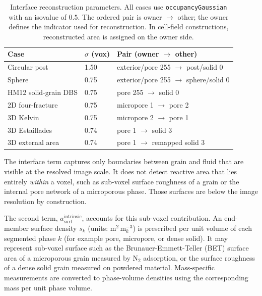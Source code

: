 \begin{table}[htbp]
    \centering
    \caption{Interface reconstruction parameters. All cases use
    \texttt{occupancyGaussian} with an isovalue of $0.5$.
    The ordered pair is owner $\rightarrow$ other; the owner defines the
    indicator used for reconstruction. In cell-field constructions,
    reconstructed area is assigned on the owner side.}
    \label{tab:surfaceConstruction}
    \scriptsize
    \setlength{\tabcolsep}{3pt}
    \begin{tabular}{@{}p{}p{}p{}@{}}
        \toprule
        Case & $\sigma$ (vox) & Pair (owner $\rightarrow$ other) \\
        \midrule
        Circular post & 1.50
            & exterior/pore 255 $\rightarrow$ post/solid 0 \\
        Sphere & 0.75
            & exterior/pore 255 $\rightarrow$ sphere/solid 0 \\
        HM12 solid-grain DBS & 0.75
            & pore 255 $\rightarrow$ solid 0 \\
        2D four-fracture & 0.75
            & micropore 1 $\rightarrow$ pore 2 \\
        3D Kelvin & 0.75
            & micropore 2 $\rightarrow$ pore 1 \\
        3D Estaillades & 0.74
            & pore 1 $\rightarrow$ solid 3 \\
        3D external area & 0.74
            & pore 1 $\rightarrow$ remapped solid 3 \\
        \bottomrule
    \end{tabular}
\end{table}

The interface term captures only boundaries between grain and fluid that are
visible at the resolved image scale. It does not detect
reactive area that lies entirely \emph{within} a voxel, such as sub-voxel
surface roughness of a grain or the internal pore network of a microporous
phase. Those surfaces are below the image resolution by construction.

The second term, $a_{\mathrm{surf}}^{\mathrm{intrinsic}}$, accounts for this
sub-voxel contribution. An end-member surface density $s_k$
(units: m$^2$\,m$^{-3}_{k}$) is prescribed per unit volume of each segmented
phase $k$ (for example pore, micropore, or dense solid). It may represent
sub-voxel surface such as the
Brunauer-Emmett-Teller (BET) surface area of a microporous grain measured by
N$_2$ adsorption, or the surface roughness of a dense solid grain measured on
powdered material. Mass-specific measurements are converted to phase-volume
densities using the corresponding mass per unit phase volume.

